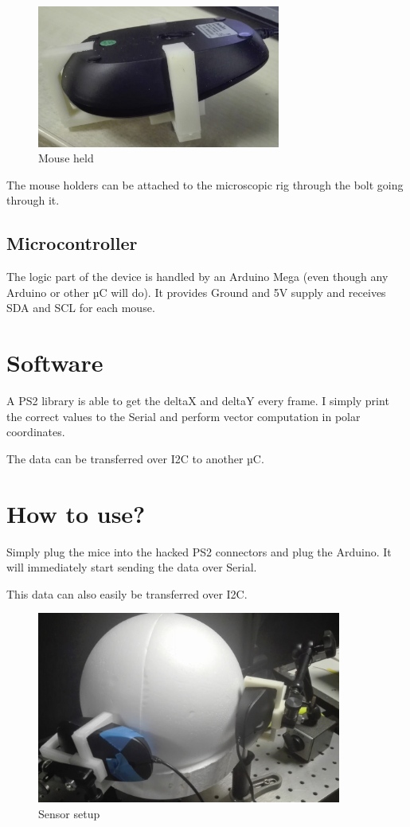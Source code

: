\documentclass[a4paper]{article}
\begin{document}
\begin{figure}[h!]
    \centering
    \includegraphics[width = 8cm]{images/cad3.jpg}
    \caption{Mouse held}
    \label{fig:cad3}
\end{figure}

The mouse holders can be attached to the microscopic rig through the bolt going through it.

\subsection{Microcontroller}
The logic part of the device is handled by an Arduino Mega (even though any Arduino or other µC will do). It provides Ground and 5V supply and receives SDA and SCL for each mouse.

\section{Software}
A PS2 library is able to get the deltaX and deltaY every frame. I simply print the correct values to the Serial and perform vector computation in polar coordinates.

The data can be transferred over I2C to another µC.

\section{How to use?}
Simply plug the mice into the hacked PS2 connectors and plug the Arduino. It will immediately start sending the data over Serial.

This data can also easily be transferred over I2C.

\begin{figure}[h!b!t!]
    \centering
    \includegraphics[width = 10cm]{images/setup.jpg}
    \caption{Sensor setup}
    \label{fig:setup}
\end{figure}
\end{document}
